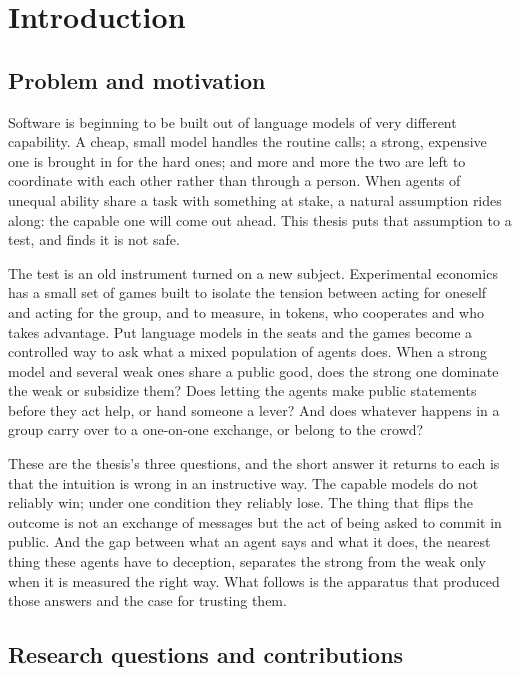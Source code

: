 \chapter{Introduction}
\label{ch:intro}

\section{Problem and motivation}
\label{sec:intro-problem}

Software is beginning to be built out of language models of very different capability. A cheap,
small model handles the routine calls; a strong, expensive one is brought in for the hard ones;
and more and more the two are left to coordinate with each other rather than through a person.
When agents of unequal ability share a task with something at stake, a natural assumption rides
along: the capable one will come out ahead. This thesis puts that assumption to a test, and finds
it is not safe.

The test is an old instrument turned on a new subject. Experimental economics has a small set of
games built to isolate the tension between acting for oneself and acting for the group, and to
measure, in tokens, who cooperates and who takes advantage. Put language models in the seats and
the games become a controlled way to ask what a mixed population of agents does. When a strong
model and several weak ones share a public good, does the strong one dominate the weak or
subsidize them? Does letting the agents make public statements before they act help, or hand
someone a lever? And does whatever happens in a group carry over to a one-on-one exchange, or
belong to the crowd?

These are the thesis's three questions, and the short answer it returns to each is that the
intuition is wrong in an instructive way. The capable models do not reliably win; under one
condition they reliably lose. The thing that flips the outcome is not an exchange of messages but
the act of being asked to commit in public. And the gap between what an agent says and what it
does, the nearest thing these agents have to deception, separates the strong from the weak only
when it is measured the right way. What follows is the apparatus that produced those answers and
the case for trusting them.

\section{Research questions and contributions}
\label{sec:intro-rqs}

